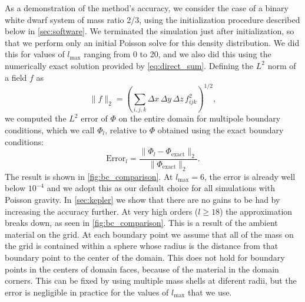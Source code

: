 \documentclass[12pt]{article}
\begin{document}
As a demonstration of the method's accuracy, we consider the case of a binary white dwarf
system of mass ratio 2/3, using the initialization procedure described below
in \autoref{sec:software}. We terminated the simulation just after
initialization, so that we perform only an initial Poisson solve for this
density distribution. We did this for values of $l_{\text{max}}$ ranging
from 0 to 20, and we also did this using the numerically exact solution
provided by \autoref{eq:direct_sum}.  Defining the $L^2$
norm of a field $f$ as
\begin{equation}
  \| f \|_2 = \left(\sum_{i,j,k} \Delta x\, \Delta y\, \Delta z\, f_{ijk}^2\right)^{1/2},
\end{equation}
we computed the $L^2$ error of $\Phi$ on the entire domain for multipole
boundary conditions, which we call $\Phi_l$, relative to $\Phi$
obtained using the exact boundary conditions:
\begin{equation}
  \text{Error}_l = \frac{\|\Phi_l - \Phi_{\text{exact}}\|_2}{\|\Phi_{\text{exact}}\|_2}.
\end{equation}
The result is shown in \autoref{fig:bc_comparison}. At $l_{\text{max}} = 6$,
the error is already well below $10^{-4}$ and we adopt this as our default
choice for all simulations with Poisson gravity. In \autoref{sec:kepler} we
show that there are no gains to be had by increasing the accuracy further. At
very high orders ($l \ge 18$) the approximation breaks down, as seen in \autoref{fig:bc_comparison}.
This is a result of the ambient material on the grid. At each boundary point we
assume that all of the mass on the grid is contained within a sphere whose radius is
the distance from that boundary point to the center of the domain. This does not hold
for boundary points in the centers of domain faces, because of the material in the
domain corners. This can be fixed by using multiple mass shells at diferent radii, but the error
is negligible in practice for the values of $l_{\text{max}}$ that we use.
\end{document}
